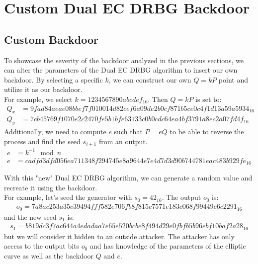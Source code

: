 \section{Custom Dual EC DRBG Backdoor}

\subsection{Custom Backdoor}

To showcase the severity of the backdoor analyzed in the previous sections, we can alter the parameters of the Dual EC DRBG algorithm to insert our own backdoor. By selecting a specific $k$, we can construct our own $Q = kP$ point and utilize it as our backdoor.
\\

For example, we select $k = 1234567890abcdef_{16}$. Then $Q = kP$ is set to:
\begin{align*}
    Q_x &= 9fad84aeae08bbef7f010014d82cef6a09de2b0cf871b5ce0c4f1d13a59a5934_{16}\\
    Q_y &= 7cb45769f1070e2c2470fe5b1bfe63133c0b0cdc64ea4bf3791a8ec2a07fd4f_{16}
\end{align*}
\noindent
Additionally, we need to compute $e$ such that $P = eQ$ to be able to reverse the process and find the seed $s_{i + 1}$ from an output.
\begin{align*}
    e &= k^{-1} \mod n\\
    e &= cadfd3dfd056ea711348f294745e8a9644e7e4d7d3d90b744781eac483b929fe_{16}
\end{align*}

\noindent
With this "new" Dual EC DRBG algorithm, we can generate a random value and recreate it using the backdoor.
\\

\noindent
For example, let's seed the generator with $s_0 = 42_{16}$. The output $o_0$ is:
\begin{align*}
    o_0 = 7a8ac253a35c39494fff582e706fb8f815c7571e183c068f99449c6c2291_{16}
\end{align*}
and the new seed $s_1$ is:
\begin{align*}
    s_1 = b819dc3f7ac644a4edadaa7e65e520bcbe8f494d29e0fbfb5b96ebf10baf2a28_{16}
\end{align*}
but we will consider it hidden to an outside attacker. The attacker has only access to the output bits $o_0$ and has knowledge of the parameters of the elliptic curve as well as the backdoor $Q$ and $e$.
\\

